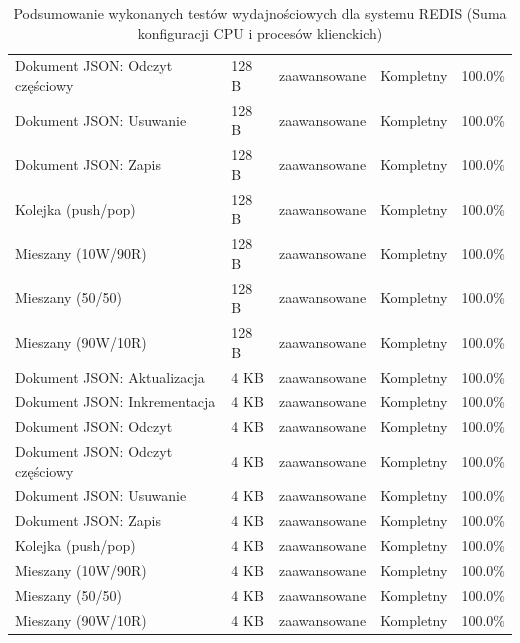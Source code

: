 \begin{table}[ht]
{\begin{tabular}{lllcc}
Dokument JSON: Odczyt częściowy & 128 B & zaawansowane & Kompletny & 100.0\% \\
Dokument JSON: Usuwanie & 128 B & zaawansowane & Kompletny & 100.0\% \\
Dokument JSON: Zapis & 128 B & zaawansowane & Kompletny & 100.0\% \\
Kolejka (push/pop) & 128 B & zaawansowane & Kompletny & 100.0\% \\
Mieszany (10W/90R) & 128 B & zaawansowane & Kompletny & 100.0\% \\
Mieszany (50/50) & 128 B & zaawansowane & Kompletny & 100.0\% \\
Mieszany (90W/10R) & 128 B & zaawansowane & Kompletny & 100.0\% \\
Dokument JSON: Aktualizacja & 4 KB & zaawansowane & Kompletny & 100.0\% \\
Dokument JSON: Inkrementacja & 4 KB & zaawansowane & Kompletny & 100.0\% \\
Dokument JSON: Odczyt & 4 KB & zaawansowane & Kompletny & 100.0\% \\
Dokument JSON: Odczyt częściowy & 4 KB & zaawansowane & Kompletny & 100.0\% \\
Dokument JSON: Usuwanie & 4 KB & zaawansowane & Kompletny & 100.0\% \\
Dokument JSON: Zapis & 4 KB & zaawansowane & Kompletny & 100.0\% \\
Kolejka (push/pop) & 4 KB & zaawansowane & Kompletny & 100.0\% \\
Mieszany (10W/90R) & 4 KB & zaawansowane & Kompletny & 100.0\% \\
Mieszany (50/50) & 4 KB & zaawansowane & Kompletny & 100.0\% \\
Mieszany (90W/10R) & 4 KB & zaawansowane & Kompletny & 100.0\% \\
\bottomrule
\end{tabular}%
}
\caption{Podsumowanie wykonanych testów wydajnościowych dla systemu REDIS (Suma konfiguracji CPU i procesów klienckich)}
\label{tab:executed_tests_redis}
\end{table}
